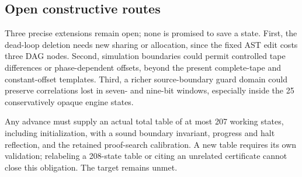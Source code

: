 \documentclass[11pt,letterpaper]{article}
\begin{document}
\subsection{Open constructive routes}
Three precise extensions remain open; none is promised to save a state.
First, the dead-loop deletion needs new sharing or allocation, since the fixed
AST edit costs three DAG nodes. Second, simulation boundaries could permit
controlled tape differences or phase-dependent offsets, beyond the present
complete-tape and constant-offset templates. Third, a richer source-boundary
guard domain could preserve correlations lost in seven- and nine-bit windows,
especially inside the 25 conservatively opaque engine states.

Any advance must supply an actual total table of at most 207 working states,
including initialization, with a sound boundary invariant, progress and halt
reflection, and the retained proof-search calibration. A new table requires
its own validation; relabeling a 208-state table or citing an unrelated
certificate cannot close this obligation. The target remains unmet.

\clearpage
\end{document}
